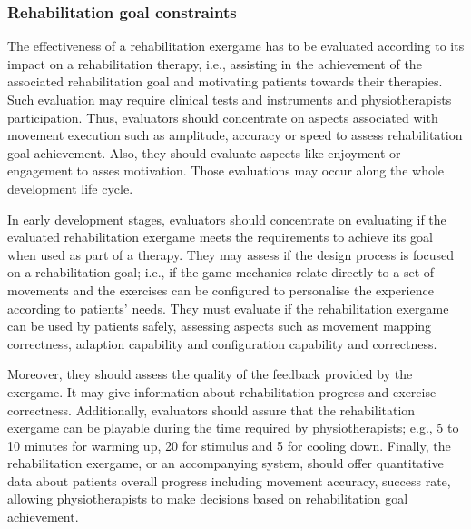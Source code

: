 \subsubsection{Rehabilitation goal constraints}
\label{sec:reh_goal_constraints}
The effectiveness of a rehabilitation exergame has to be evaluated according to its impact on a rehabilitation therapy, i.e., assisting in the achievement of the associated rehabilitation goal and motivating patients towards their therapies. Such evaluation may require clinical tests and instruments and physiotherapists participation. Thus, evaluators should concentrate on aspects associated with movement execution such as amplitude, accuracy or speed to assess rehabilitation goal achievement. Also, they should evaluate aspects like enjoyment or engagement to asses motivation. Those evaluations may occur along the whole development life cycle.

In early development stages, evaluators should concentrate on evaluating if the evaluated rehabilitation exergame meets the requirements to achieve its goal when used as part of a therapy. They may assess if the design process is focused on a rehabilitation goal; i.e., if the game mechanics relate directly to a set of movements and the exercises can be configured to personalise the experience according to patients' needs. They must evaluate if the rehabilitation exergame can be used by patients safely, assessing aspects such as movement mapping correctness, adaption capability and configuration capability and correctness. 

Moreover, they should assess the quality of the feedback provided by the exergame. It may give information about rehabilitation progress and exercise correctness. Additionally, evaluators should assure that the rehabilitation exergame can be playable during the time required by physiotherapists; e.g., 5 to 10 minutes for warming up, 20 for stimulus and 5 for cooling down. Finally, the rehabilitation exergame, or an accompanying system, should offer quantitative data about patients overall progress including movement accuracy, success rate, allowing physiotherapists to make decisions based on rehabilitation goal achievement.

